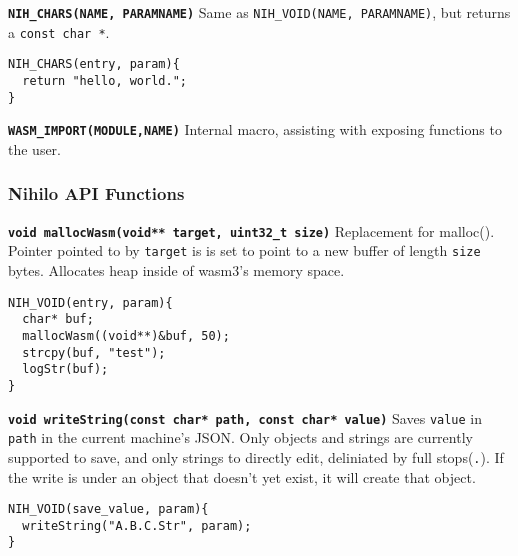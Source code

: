 \documentclass{article}
\begin{document}
\textbf{\texttt{NIH\_CHARS(NAME, PARAMNAME)}}\newline
Same as \texttt{NIH\_VOID(NAME, PARAMNAME)}, but returns a \texttt{const char *}.

\begin{tcolorbox}[colback=white,grow to left by=2.5mm,grow to right by=2.5mm,left*=0mm,right*=0mm,sharp corners]
\begin{verbatim}
NIH_CHARS(entry, param){
  return "hello, world.";
}
\end{verbatim}
\end{tcolorbox}

\textbf{\texttt{WASM\_IMPORT(MODULE,NAME)}}\newline
Internal macro, assisting with exposing functions to the user.

\subsubsection{Nihilo API Functions}

\textbf{\texttt{void mallocWasm(void** target, uint32\_t size)}}\newline
Replacement for malloc(). Pointer pointed to by \texttt{target} is is set to point to a new buffer of length \texttt{size} bytes. Allocates heap inside of wasm3's memory space.

\begin{tcolorbox}[colback=white,grow to left by=2.5mm,grow to right by=2.5mm,left*=0mm,right*=0mm,sharp corners]
\begin{verbatim}
NIH_VOID(entry, param){
  char* buf;
  mallocWasm((void**)&buf, 50);
  strcpy(buf, "test");
  logStr(buf);
}
\end{verbatim}
\end{tcolorbox}

\textbf{\texttt{void writeString(const char* path, const char* value)}}\newline
Saves \texttt{value} in \texttt{path} in the current machine's JSON. Only objects and strings are currently supported to save, and only strings to directly edit, deliniated by full stops(\texttt{.}). If the write is under an object that doesn't yet exist, it will create that object.

\begin{tcolorbox}[colback=white,grow to left by=2.5mm,grow to right by=2.5mm,left*=0mm,right*=0mm,sharp corners]
\begin{verbatim}
NIH_VOID(save_value, param){
  writeString("A.B.C.Str", param);
}
\end{verbatim}
\end{tcolorbox}
\end{document}
